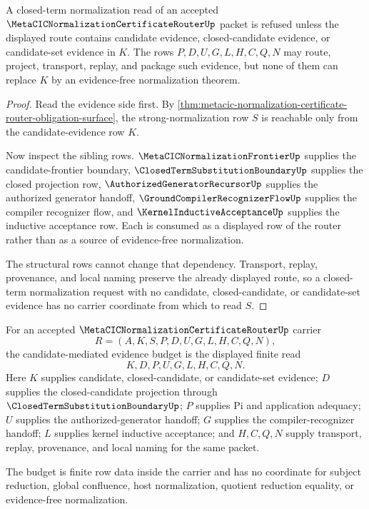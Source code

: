\begin{theorem}
\label{thm:metacic-normalization-certificate-router-closed-read-refusal}
A closed-term normalization read of an accepted $\MetaCICNormalizationCertificateRouterUp$ packet is refused unless the displayed route contains candidate evidence, closed-candidate evidence, or candidate-set evidence in $K$. The rows $P,D,U,G,L,H,C,Q,N$ may route, project, transport, replay, and package such evidence, but none of them can replace $K$ by an evidence-free normalization theorem.
\end{theorem}
\begin{proof}
Read the evidence side first. By \autoref{thm:metacic-normalization-certificate-router-obligation-surface}, the strong-normalization row $S$ is reachable only from the candidate-evidence row $K$.

Now inspect the sibling rows. $\MetaCICNormalizationFrontierUp$ supplies the candidate-frontier boundary, $\ClosedTermSubstitutionBoundaryUp$ supplies the closed projection row, $\AuthorizedGeneratorRecursorUp$ supplies the authorized generator handoff, $\GroundCompilerRecognizerFlowUp$ supplies the compiler recognizer flow, and $\KernelInductiveAcceptanceUp$ supplies the inductive acceptance row. Each is consumed as a displayed row of the router rather than as a source of evidence-free normalization.

The structural rows cannot change that dependency. Transport, replay, provenance, and local naming preserve the already displayed route, so a closed-term normalization request with no candidate, closed-candidate, or candidate-set evidence has no carrier coordinate from which to read $S$.
\end{proof}

\begin{definition}
\label{def:normalization-candidate-router-evidence-budget}
For an accepted $\MetaCICNormalizationCertificateRouterUp$ carrier
$$
R=(A,K,S,P,D,U,G,L,H,C,Q,N),
$$
the candidate-mediated evidence budget is the displayed finite read
$$
K,D,P,U,G,L,H,C,Q,N.
$$
Here $K$ supplies candidate, closed-candidate, or candidate-set evidence; $D$ supplies the closed-candidate projection through $\ClosedTermSubstitutionBoundaryUp$; $P$ supplies Pi and application adequacy; $U$ supplies the authorized-generator handoff; $G$ supplies the compiler-recognizer handoff; $L$ supplies kernel inductive acceptance; and $H,C,Q,N$ supply transport, replay, provenance, and local naming for the same packet.

The budget is finite row data inside the carrier and has no coordinate for subject reduction, global confluence, host normalization, quotient reduction equality, or evidence-free normalization.
\end{definition}

